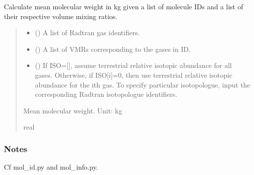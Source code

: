 \documentclass[letterpaper,10pt,english]{sphinxmanual}
\begin{document}
\begin{fulllineitems}
\label{\detokenize{api:nemesispy.calc_mmw}}
\pysigstartsignatures
{}
\pysigstopsignatures
\sphinxAtStartPar
Calculate mean molecular weight in kg given a list of molecule IDs and
a list of their respective volume mixing ratios.
\begin{quote}\begin{description}
\begin{itemize}
\item {} 
\sphinxAtStartPar
{} () \textendash{} A list of Radtran gas identifiers.

\item {} 
\sphinxAtStartPar
{} () \textendash{} A list of VMRs corresponding to the gases in ID.

\item {} 
\sphinxAtStartPar
{} () \textendash{} If ISO={[}{]}, assume terrestrial relative isotopic abundance for all gases.
Otherwise, if ISO{[}i{]}=0, then use terrestrial relative isotopic abundance
for the ith gas. To specify particular isotopologue, input the
corresponding Radtran isotopologue identifiers.

\end{itemize}

\sphinxAtStartPar
{} \textendash{} Mean molecular weight.
Unit: kg

\sphinxAtStartPar
real

\end{description}\end{quote}
\subsubsection*{Notes}

\sphinxAtStartPar
Cf mol\_id.py and mol\_info.py.

\end{fulllineitems}
\end{document}
